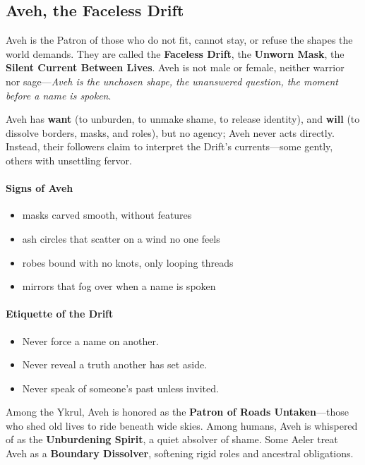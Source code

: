 \documentclass[11pt]{book}
\begin{document}
    \subsection{Aveh, the Faceless Drift}

Aveh is the Patron of those who do not fit, cannot stay, or refuse the shapes the world demands.  
They are called the \textbf{Faceless Drift}, the \textbf{Unworn Mask}, the \textbf{Silent Current Between Lives}.  
Aveh is not male or female, neither warrior nor sage---\emph{Aveh is the unchosen shape, the unanswered question, the moment before a name is spoken}.

Aveh has \textbf{want} (to unburden, to unmake shame, to release identity),  
and \textbf{will} (to dissolve borders, masks, and roles),  
but no agency; Aveh never acts directly.  
Instead, their followers claim to interpret the Drift's currents---some gently, others with unsettling fervor.

\paragraph{Signs of Aveh}
\begin{itemize}
    \item masks carved smooth, without features  
    \item ash circles that scatter on a wind no one feels  
    \item robes bound with no knots, only looping threads  
    \item mirrors that fog over when a name is spoken  
\end{itemize}

\paragraph{Etiquette of the Drift}
\begin{itemize}
    \item Never force a name on another.  
    \item Never reveal a truth another has set aside.  
    \item Never speak of someone's past unless invited.  
\end{itemize}

Among the Ykrul, Aveh is honored as the \textbf{Patron of Roads Untaken}---those who shed old lives to ride beneath wide skies.  
Among humans, Aveh is whispered of as the \textbf{Unburdening Spirit}, a quiet absolver of shame.  
Some Aeler treat Aveh as a \textbf{Boundary Dissolver}, softening rigid roles and ancestral obligations.
\end{document}
